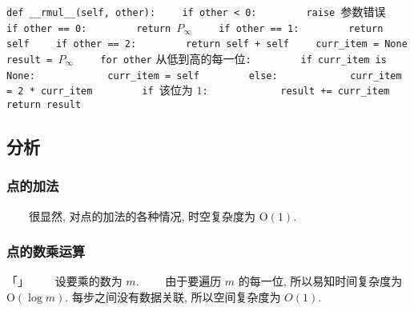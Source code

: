 \documentclass[12pt,a4paper]{article}
\begin{document}
\lstinline{def __rmul__(self, other):}
\newline
\lstinline{    if other < 0:}
\newline
\lstinline{        raise }参数错误
\newline
\lstinline{    if other == 0:}
\newline
\lstinline{        return }$ P_{\infty} $
\newline
\lstinline{    if other == 1:}
\newline
\lstinline{        return self}
\newline
\lstinline{    if other == 2:}
\newline
\lstinline{        return self + self}
\newline
\lstinline{    curr_item = None}
\newline
\lstinline{    result = }$ P_{\infty} $
\newline
\lstinline{    for other} 从低到高的每一位\lstinline{:}
\newline
\lstinline{        if curr_item is None:}
\newline
\lstinline{            curr_item = self}
\newline
\lstinline{        else:}
\newline
\lstinline{            curr_item = 2 * curr_item}
\newline
\lstinline{        if }该位为 $1$\lstinline{:}
\newline
\lstinline{            result += curr_item}
\newline
\lstinline{    return result}

\subsection*{分析}

\subsubsection*{点的加法}

　　很显然, 对点的加法的各种情况, 时空复杂度为 $ \mathrm{O}(1) $.

\subsubsection*{点的数乘运算}
「」
　　设要乘的数为 $ m $.
\newline
　　由于要遍历 $ m $ 的每一位, 所以易知时间复杂度为 $ \mathrm{O}(\log m) $. 每步之间没有数据关联, 所以空间复杂度为 $ O(1) $.
\end{document}
